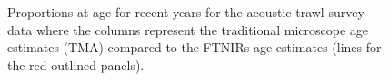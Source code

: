 \documentclass[
  letterpaper,
  DIV=11,
  numbers=noendperiod]{scrreprt}
\begin{document}
\begin{figure}


\caption{\label{fig-proportionsATS}Proportions at age for recent years
for the acoustic-trawl survey data where the columns represent the
traditional microscope age estimates (TMA) compared to the FTNIRs age
estimates (lines for the red-outlined panels).}

\end{figure}%
\end{document}
